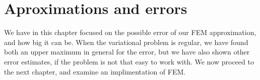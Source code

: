 \chapter{Aproximations and errors}










We have in this chapter focused on the possible error of our FEM approximation, 
and how big it can be. 
When the variational problem is regular, we have found both an upper maximum 
in general for the error, but we have also shown other error estimates, 
if the problem is not that easy to work with.
We now proceed to the next chapter, and examine an implimentation of 
FEM.